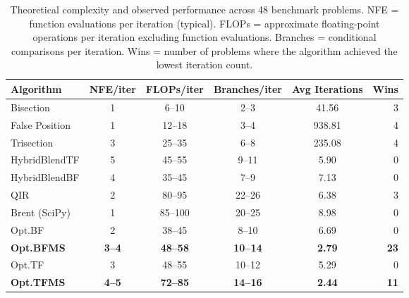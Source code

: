 \documentclass[amsmath, amssymb, aps]{revtex4-2}
\begin{document}
\begin{table}[H]
\centering
\caption{Theoretical complexity and observed performance across 48 benchmark problems. NFE = function evaluations per iteration (typical). FLOPs = approximate floating-point operations per iteration excluding function evaluations. Branches = conditional comparisons per iteration. Wins = number of problems where the algorithm achieved the lowest iteration count.}
\label{tab:complexity_comparison}
\begin{tabular}{lccccr}
\hline
Algorithm & NFE/iter & FLOPs/iter & Branches/iter & Avg Iterations & Wins \\
\hline
Bisection                    & 1          & 6--10    & 2--3   & 41.56  & 3  \\
False Position               & 1          & 12--18   & 3--4   & 938.81 & 4  \\
Trisection                   & 3          & 25--35   & 6--8   & 235.08 & 4  \\
HybridBlendTF                & 5          & 45--55   & 9--11  & 5.90   & 0  \\
HybridBlendBF                & 4          & 35--45   & 7--9   & 7.13   & 0  \\
QIR                          & 2          & 80--95   & 22--26 & 6.38   & 3  \\
Brent (SciPy)                & 1          & 85--100  & 20--25 & 8.98   & 0  \\
Opt.BF                       & 2          & 38--45   & 8--10  & 6.69   & 0  \\
\textbf{Opt.BFMS}            & \textbf{3--4} & \textbf{48--58} & \textbf{10--14} & \textbf{2.79} & \textbf{23} \\
Opt.TF                       & 3          & 48--55   & 10--12 & 5.29   & 0  \\
\textbf{Opt.TFMS}            & \textbf{4--5} & \textbf{72--85} & \textbf{14--16} & \textbf{2.44} & \textbf{11} \\
\hline
\end{tabular}
\end{table}
\FloatBarrier
\end{document}
